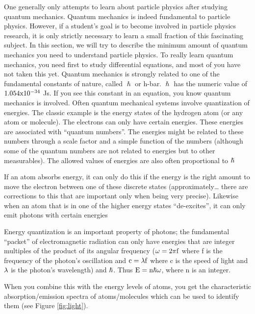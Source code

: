One generally only attempts to learn about particle physics after studying quantum mechanics.  Quantum mechanics is indeed fundamental to particle physics.  However, if a 
student's goal is to become involved in particle physics research, it is only strictly necessary to learn a small fraction of this fascinating subject.  In this section, we will try to describe the minimum amount of quantum mechanics you need to understand particle physics.  To really learn quantum mechanics, you need first to study differential equations, and most of you have not taken this yet.
Quantum mechanics is strongly related to one of the fundamental constants of nature, called 
$\hslash$ or h-bar.  $\hslash$ has the numeric value of ${\rm 1.054x10^{-34}}$ Js.  
If you see this constant in an equation, you know quantum mechanics is involved.
Often quantum mechanical systems involve quantization of energies.  The classic example is the energy states of the hydrogen atom (or any atom or molecule).  The electrons can only have certain energies.  These energies are associated with ``quantum numbers''.  The energies might be related to these numbers through a scale factor and a simple function of the numbers 
(although some of the quantum numbers are not related to energies but to other measurables).  The allowed values of energies are also often proportional to
${\rm \hslash}$

If an atom absorbs energy, it can only do this if the energy is the right amount to move the electron between one of these discrete states (approximately… there are corrections to this that are important only when being very precise).  Likewise when an atom that is in one of the higher energy states “de-excites”, it can only emit photons with certain energies

Energy quantization is an important property of  photons; the fundamental “packet” of electromagnetic radiation can only have energies that are integer multiples of the product of its angular frequency (${\rm \omega = 2 \pi f}$ where f is the frequency of the photon’s oscillation and ${\rm c = \lambda f}$  where c is the speed of light and ${\rm \lambda}$  is the photon’s wavelength) and ${\rm \hslash}$.  
Thus ${\rm E=n \hslash \omega}$,  where n is an integer.

When you combine this with the energy levels of atoms, you get the characteristic absorption/emission spectra of atoms/molecules which can be used to identify them (see Figure \ref{fig:light}).


